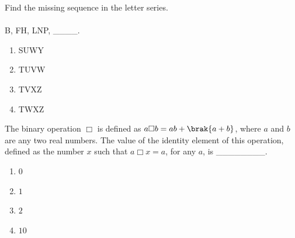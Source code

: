     \item Find the missing sequence in the letter series. \\ \\ B, FH, LNP, \_\_\_\_.
        \begin{enumerate}
            \item SUWY
            \item TUVW
            \item TVXZ
            \item TWXZ
        \end{enumerate}

    \item The binary operation $\Box$ is defined as $a \Box b = ab+\brak{a+b}$, where $a$ and $b$ are any two real numbers. The value of the identity element of this operation, defined as the number $x$ such that $a \Box x = a$, for any $a$, is \_\_\_\_\_\_\_\_.
        \begin{enumerate}
            \item $0$
            \item $1$
            \item $2$
            \item $10$
        \end{enumerate}

